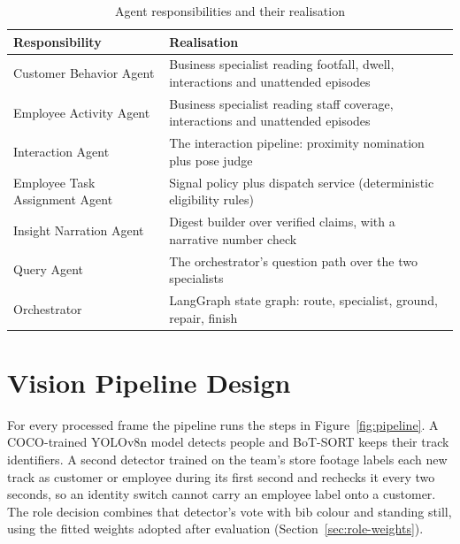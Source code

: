 \begin{table}[H]
\centering
\caption{Agent responsibilities and their realisation}\label{tab:agent-map}
\begin{tabular}{P{0.27\textwidth}P{0.65\textwidth}}
\toprule
Responsibility & Realisation\\
\midrule
Customer Behavior Agent & Business specialist reading footfall, dwell, interactions and unattended episodes\\
Employee Activity Agent & Business specialist reading staff coverage, interactions and unattended episodes\\
Interaction Agent & The interaction pipeline: proximity nomination plus pose judge\\
Employee Task Assignment Agent & Signal policy plus dispatch service (deterministic eligibility rules)\\
Insight Narration Agent & Digest builder over verified claims, with a narrative number check\\
Query Agent & The orchestrator's question path over the two specialists\\
Orchestrator & LangGraph state graph: route, specialist, ground, repair, finish\\
\bottomrule
\end{tabular}
\end{table}

\section{Vision Pipeline Design}
For every processed frame the pipeline runs the steps in Figure~\ref{fig:pipeline}. A COCO-trained YOLOv8n model detects people and BoT-SORT keeps their track identifiers. A second detector trained on the team's store footage labels each new track as customer or employee during its first second and rechecks it every two seconds, so an identity switch cannot carry an employee label onto a customer. The role decision combines that detector's vote with bib colour and standing still, using the fitted weights adopted after evaluation (Section~\ref{sec:role-weights}).

